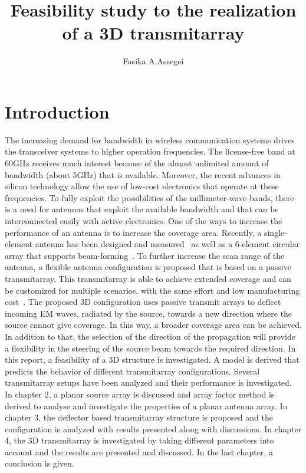 \documentclass[titlepage]{article}
\begin{document}
\title{Feasibility study to the realization of a 3D transmitarray}
\author{Fasika A.Assegei}
\maketitle
\newpage
\tableofcontents
\newpage
\listoffigures
\newpage
\section{Introduction}
The increasing demand for bandwidth in wireless communication systems drives the transceiver systems to higher operation frequencies. The license-free band at 60GHz receives much interest because of the almost unlimited amount of bandwidth (about 5GHz) that is available. Moreover, the recent advances in silicon technology allow the use of low-cost electronics that operate at these frequencies. To fully exploit the possibilities of the millimeter-wave bands, there is a need for antennas that exploit the available bandwidth and that can be interconnected easily with active electronics.
\newline
One of the ways to increase the performance of an antenna is to increase the coverage area. Recently, a single-element antenna has been designed and measured~\cite{1} as well as a 6-element circular array that supports beam-forming~\cite{2}. To further increase the scan range of the antenna, a flexible antenna configuration is proposed that is based on a passive transmitarray. This transmitarray is able to achieve extended coverage and can be customized for multiple scenarios, with the same effort and low manufacturing cost~\cite{4}. The proposed 3D configuration uses passive transmit arrays to deflect incoming EM waves, radiated by the source, towards a new direction where the source cannot give coverage. In this way, a broader coverage area can be achieved. In addition to that, the selection of the direction of the propagation will provide a flexibility in the steering of the source beam towards the required direction.
\newline
In this report, a feasibility of a 3D structure is investigated. A model is derived that predicts the behavior of different transmitarray configurations. Several transmitarray setups have been analyzed and their performance is investigated.
\newline
In chapter 2, a planar source array is discussed and array factor method is derived to analyse and investigate the properties of a planar antenna array. In chapter 3, the deflector based transmitarray structure is proposed and the configuration is analyzed with results presented along with discussions. In chapter 4, the 3D transmitarray is investigated by taking different parameters into account and the results are presented and discussed. In the last chapter, a conclusion is given.
\newpage
\end{document}
